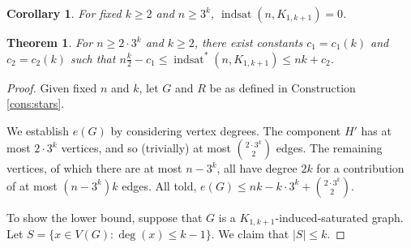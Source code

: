 \documentclass[12pt]{amsart}
\theoremstyle{plain}
\newtheorem{thm}{Theorem}[section]
\newtheorem{cor}{Corollary}[thm]
\theoremstyle{definition}
\theoremstyle{remark}
\newcommand{\indsat}[2]{\ensuremath{\operatorname{indsat}(#1,#2)}\xspace}
\newcommand{\sis}[2]{\ensuremath{{\operatorname{indsat}}^*(#1,#2)}\xspace}
\begin{document}
\begin{cor}\label{cor:stars}
For fixed $k \ge 2$ and $n \ge 3^k$, $\indsat{n}{K_{1,k+1}} = 0$.
\end{cor}


\begin{thm}\label{bound:stars}
For $n \geq 2\cdot 3^k$ and $k \geq 2$, there exist constants $c_1=c_1(k)$ and $c_2 = c_2(k)$ such that $n\frac{k}{2} - c_1 \le \sis{n}{K_{1,k+1}} \leq nk+c_2$.
\end{thm}
\begin{proof}
Given fixed $n$ and $k$, let $G$ and $R$ be as defined in Construction \ref{cons:stars}.

We  establish $e(G)$ by considering vertex degrees. The component $H'$ has at most $2\cdot 3^k$ vertices, and so (trivially) at most ${2\cdot 3^k \choose 2}$ edges. The remaining vertices, of which there are at most $n-3^k$, all have degree $2k$ for a contribution of at most $(n-3^k)k$ edges. All told, $e(G) \leq nk-k\cdot 3^k + {2\cdot 3^k \choose 2}$.

To show the lower bound, suppose that $G$ is a $K_{1,k+1}$-induced-saturated graph.  Let $S=\{x \in V(G) \colon \deg(x) \le k-1\}$. %
We claim that $|S| \le k$.


\end{proof}
\end{document}
